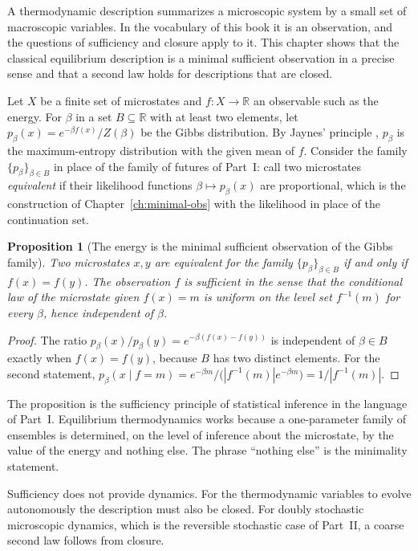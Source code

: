 \documentclass[11pt,oneside]{book}
\newtheorem{proposition}[theorem]{Proposition}
\theoremstyle{definition}
\theoremstyle{remark}
\begin{document}
A thermodynamic description summarizes a microscopic system by a small set of macroscopic variables. In the vocabulary of this book it is an observation, and the questions of sufficiency and closure apply to it. This chapter shows that the classical equilibrium description is a minimal sufficient observation in a precise sense and that a second law holds for descriptions that are closed.

Let $X$ be a finite set of microstates and $f\colon X\to\mathbb R$ an observable such as the energy. For $\beta$ in a set $B\subseteq\mathbb R$ with at least two elements, let $p_\beta(x)=e^{-\beta f(x)}/Z(\beta)$ be the Gibbs distribution. By Jaynes' principle \cite{jaynes1957}, $p_\beta$ is the maximum-entropy distribution with the given mean of $f$. Consider the family $\{p_\beta\}_{\beta\in B}$ in place of the family of futures of Part~I: call two microstates \emph{equivalent} if their likelihood functions $\beta\mapsto p_\beta(x)$ are proportional, which is the construction of Chapter~\ref{ch:minimal-obs} with the likelihood in place of the continuation set.

\begin{proposition}[The energy is the minimal sufficient observation of the Gibbs family]\label{prop:gibbs-suff}
Two microstates $x,y$ are equivalent for the family $\{p_\beta\}_{\beta\in B}$ if and only if $f(x)=f(y)$. The observation $f$ is sufficient in the sense that the conditional law of the microstate given $f(x)=m$ is uniform on the level set $f^{-1}(m)$ for every $\beta$, hence independent of $\beta$.
\end{proposition}

\begin{proof}
The ratio $p_\beta(x)/p_\beta(y)=e^{-\beta(f(x)-f(y))}$ is independent of $\beta\in B$ exactly when $f(x)=f(y)$, because $B$ has two distinct elements. For the second statement, $p_\beta(x\mid f=m)=e^{-\beta m}/\bigl(|f^{-1}(m)|e^{-\beta m}\bigr)=1/|f^{-1}(m)|$.
\end{proof}

The proposition is the sufficiency principle of statistical inference in the language of Part~I. Equilibrium thermodynamics works because a one-parameter family of ensembles is determined, on the level of inference about the microstate, by the value of the energy and nothing else. The phrase ``nothing else'' is the minimality statement.

Sufficiency does not provide dynamics. For the thermodynamic variables to evolve autonomously the description must also be closed. For doubly stochastic microscopic dynamics, which is the reversible stochastic case of Part~II, a coarse second law follows from closure.
\end{document}
